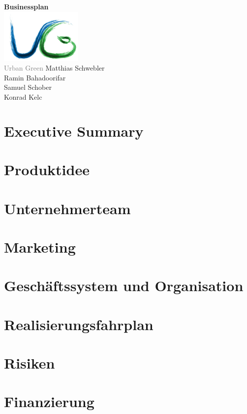 \documentclass[11pt]{article}
\begin{document}
\begin{titlepage}
    \centering
    \vfill
    {
        \Huge\textbf{Businessplan}\\
        \vskip2cm
        \includegraphics[width=4cm]{logo} \\
        \Large 
        {\selectfont 
			\textcolor{gray}{Urban Green}%
		}
        \vskip3cm
        Matthias Schwebler\\
        Ramin Bahadoorifar\\
        Samuel Schober\\
        Konrad Kelc\\
    }    
    \vfill
    
    \vfill
    \vfill
\end{titlepage}

\section{Executive Summary}
\section{Produktidee}
\section{Unternehmerteam}
\section{Marketing}
\section{Gesch\"aftssystem und Organisation}
\section{Realisierungsfahrplan}
\section{Risiken}
\section{Finanzierung}
\end{document}
